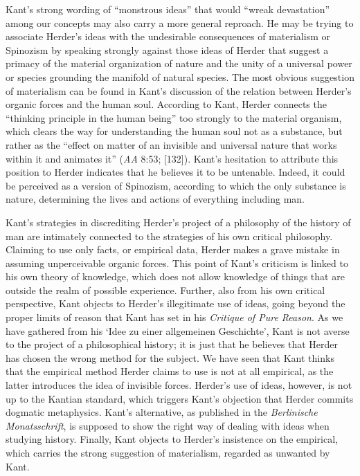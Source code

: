 Kant's strong wording of ``monstrous ideas'' that would ``wreak devastation'' among our concepts may also carry a more general reproach. He may be trying to associate Herder's ideas with the undesirable consequences of materialism or Spinozism by speaking strongly against those ideas of Herder that suggest a primacy of the material organization of nature and the unity of a universal power or species grounding the manifold of natural species. The most obvious suggestion of materialism can be found in Kant's discussion of the relation between Herder's organic forces and the human soul. According to Kant, Herder connects the ``thinking principle in the human being'' too strongly to the material organism, which clears the way for understanding the human soul not as a substance, but rather as the ``effect on matter of an invisible and universal nature that works within it and animates it'' (\textit{AA} 8:53; [132]). Kant's hesitation to attribute this position to Herder indicates that he believes it to be untenable. Indeed, it could be perceived as a version of Spinozism, according to which the only substance is nature, determining the lives and actions of everything including man. 

Kant's strategies in discrediting Herder's project of a philosophy of the history of man are intimately connected to the strategies of his own critical philosophy. Claiming to use only facts, or empirical data, Herder makes a grave mistake in assuming unperceivable organic forces. This point of Kant's criticism is linked to his own theory of knowledge, which does not allow knowledge of things that are outside the realm of possible experience. Further, also from his own critical perspective, Kant objects to Herder's illegitimate use of ideas, going beyond the proper limits of reason that Kant has set in his \textit{Critique of Pure Reason}. As we have gathered from his `Idee zu einer allgemeinen Geschichte', Kant is not averse to the project of a philosophical history; it is just that he believes that Herder has chosen the wrong method for the subject. We have seen that Kant thinks that the empirical method Herder claims to use is not at all empirical, as the latter introduces the idea of invisible forces. Herder's use of ideas, however, is not up to the Kantian standard, which triggers Kant's objection that Herder commits dogmatic metaphysics. Kant's alternative, as published in the \textit{Berlinische Monatsschrift}, is supposed to show the right way of dealing with ideas when studying history. Finally, Kant objects to Herder's insistence on the empirical, which carries the strong suggestion of materialism, regarded as unwanted by Kant. 


